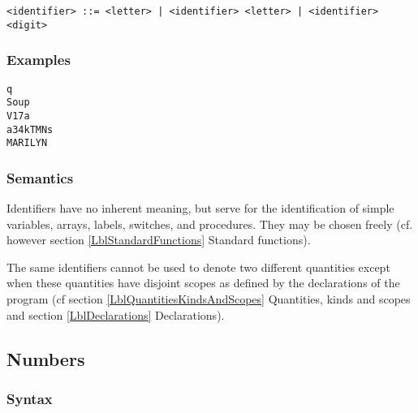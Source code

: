 \documentclass[a4paper,11pt]{article}
\begin{document}
\begin{flushleft}
\vspace{0.2em}\texttt{<identifier> ::= <letter> | <identifier> <letter> | <identifier> <digit>}\\
\end{flushleft}



\subsubsection{Examples}

\begin{verbatim}
q
Soup
V17a
a34kTMNs
MARILYN
\end{verbatim}


\subsubsection{Semantics}
\label{LblBasicSymbolsIdentifiersSemantics}

Identifiers have no inherent meaning, but serve for the identification
of simple variables, arrays, labels, switches, and procedures. They
may be chosen freely (cf. however section \ref{LblStandardFunctions}
Standard functions).

The same identifiers cannot be used to denote two different quantities
except when these quantities have disjoint scopes as defined by the
declarations of the program (cf section \ref{LblQuantitiesKindsAndScopes}
Quantities, kinds and scopes and section \ref{LblDeclarations}
Declarations).



\subsection{Numbers}
\label{LblBasicSymbolsNumbers}


\subsubsection{Syntax}
\label{LblBasicSymbolsNumbersSyntax}
\end{document}
